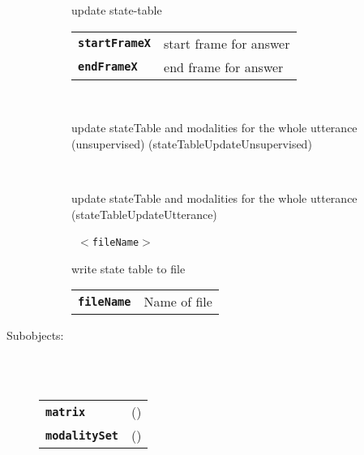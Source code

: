 \begin{description}
\begin{description}
        update state-table

      \begin{tabular}{ll}
 \texttt{\textbf{startFrameX}} &  start frame for answer  \\
 \texttt{\textbf{endFrameX}} &    end frame for answer  \\
      \end{tabular}
       \texttt{} \

        update stateTable and modalities for the whole utterance (unsupervised) (stateTableUpdateUnsupervised)

       \texttt{} \

        update stateTable and modalities for the whole utterance (stateTableUpdateUtterance)

       \texttt{ $<$fileName$>$} \

        write state table to file

      \begin{tabular}{ll}
 \texttt{\textbf{fileName}} &  Name of file  \\
      \end{tabular}
    \end{description}

  \item[Subobjects:] \hfill \\
\ 
    \begin{tabular}{ll}
      \texttt{\textbf{matrix}} & (\Jref{module}{IMatrix}) \\
      \texttt{\textbf{modalitySet}} & (\Jref{module}{ModalitySet}) \\
    \end{tabular}
\vspace{3mm}

\end{description}

